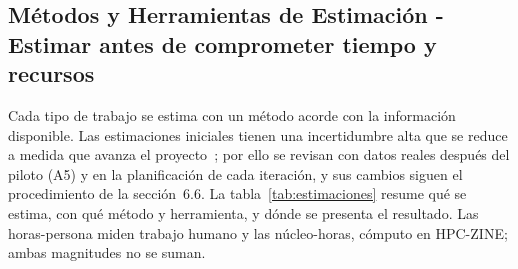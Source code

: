 \subsection{Métodos y Herramientas de Estimación - Estimar antes de comprometer tiempo y recursos}\label{sec:spmp-9-1}




Cada tipo de trabajo se estima con un método acorde con la información disponible. Las estimaciones iniciales tienen una incertidumbre alta que se reduce a medida que avanza el proyecto~\cite{mcconnell2006estimation}; por ello se revisan con datos reales después del piloto (A5) y en la planificación de cada iteración, y sus cambios siguen el procedimiento de la sección~6.6. La tabla~\ref{tab:estimaciones} resume qué se estima, con qué método y herramienta, y dónde se presenta el resultado. Las horas-persona miden trabajo humano y las núcleo-horas, cómputo en HPC-ZINE; ambas magnitudes no se suman.

